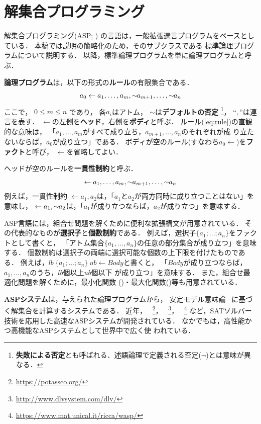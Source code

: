 \chapter{解集合プログラミング}\label{chap:asp}

解集合プログラミング(ASP; \cite{%
  Baral03:cambridge,%
  Gelfond88:iclp,%
  Niemela99:amai,%
  Inoue08:jssst})
の言語は，一般拡張選言プログラムをベースとしている．
本稿では説明の簡略化のため，そのサブクラスである
標準論理プログラムについて説明する．
以降，標準論理プログラムを単に論理プログラムと呼ぶ．

\textbf{論理プログラム}は，以下の形式の\textbf{ルール}の有限集合である．
\begin{equation}
  \label{eq:rule}
  a_0\leftarrow a_1,\dots,a_m,{\sim\!\!{a_{m+1}}},\dots,{\sim\!\!{a_n}}
\end{equation}
ここで，
$0\leq m\leq n$ であり，
各$a_i$はアトム，
${\sim\!\!{}}$は\textbf{デフォルトの否定}
\footnote{\textbf{失敗による否定}とも呼ばれる．述語論理で定義される否定($\neg$)とは意味が異なる．}，
``$,$''は連言を表す．
$\leftarrow$の左側を\textbf{ヘッド}，右側を\textbf{ボディ}と呼ぶ．
ルール(\ref{eq:rule})の直観的な意味は，
「$a_1,\ldots,a_m$がすべて成り立ち，$a_{m+1},\ldots,a_n$のそれぞれが成
り立たないならば，$a_0$が成り立つ」である．
ボディが空のルール(すなわち\(a_0\leftarrow\))を\textbf{ファクト}と呼び，
$\leftarrow$を省略してよい．

ヘッドが空のルールを\textbf{一貫性制約}と呼ぶ．
\begin{equation}
  \label{eq:constr}
  \leftarrow a_1,\dots,a_m,{\sim\!\!{a_{m+1}}},\dots,{\sim\!\!{a_n}}
\end{equation}
例えば，一貫性制約
\(\leftarrow a_1,a_2\)は，「$a_1$と$a_2$が両方同時に成り立つことはない」を意味し，
\(\leftarrow a_1, {\sim\!\!{a_{2}}}\)は，「$a_1$が成り立つならば，$a_2$が成り立つ」を意味する．

ASP言語には，組合せ問題を解くために便利な拡張構文が用意されている．
その代表的なものが\textbf{選択子}と\textbf{個数制約}である．
例えば，選択子\(\{a_1;\dots;a_n\}\)をファクトとして書くと，
「アトム集合\(\{a_1,\dots,a_n\}\)の任意の部分集合が成り立つ」を意味する．
個数制約は選択子の両端に選択可能な個数の上下限を付けたものである．
例えば，\(lb\ \{a_1;\dots;a_n\}\ ub \leftarrow Body\)と書くと，
「$Body$が成り立つならば，$a_1,\dots,a_n$のうち，$lb$個以上$ub$個以下
が成り立つ」を意味する．
また，組合せ最適化問題を解くために，最小化関数
()・最大化関数()等も用意されている．

\textbf{ASPシステム}は，与えられた論理プログラムから，
安定モデル意味論~\cite{Gelfond88:iclp}
に基づく解集合を計算するシステムである．
近年，
{\clingo}~\footnote{\url{https://potassco.org/}}，
{\dlv}~\footnote{\url{http://www.dlvsystem.com/dlv/}}，
{\wasp}~\footnote{\url{https://www.mat.unical.it/ricca/wasp/}}
など，SATソルバー技術を応用した高速なASPシステムが開発されている．
なかでも{\clingo}は，高性能かつ高機能なASPシステムとして世界中で広く使
われている．

